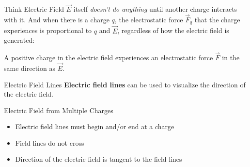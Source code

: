 \documentclass[12pt,aspectratio=169]{beamer}
\begin{document}
\begin{frame}{Think Electric Field}
  $\vec E$ itself \emph{doesn't do anything} until another charge interacts with
  it. And when there is a charge $q$, the electrostatic force $\vec F_q$ that
  the charge experiences is proportional to $q$ and $\vec E$, regardless of how
  the electric field is generated:


  A positive charge in the electric field experiences an electrostatic force
  $\vec F$ in the same direction as $\vec E$.
\end{frame}



\begin{frame}{Electric Field Lines}
  \textbf{Electric field lines} can be used to visualize the direction of the
  electric field.
  \begin{center}
    \hspace{.2in}
  \end{center}
\end{frame}



\begin{frame}{Electric Field from Multiple Charges}
  \begin{center}
  \end{center}
  \begin{itemize}
  \item Electric field lines must begin and/or end at a charge
  \item Field lines do not cross
  \item Direction of the electric field is tangent to the field lines
  \end{itemize}
\end{frame}
\end{document}
